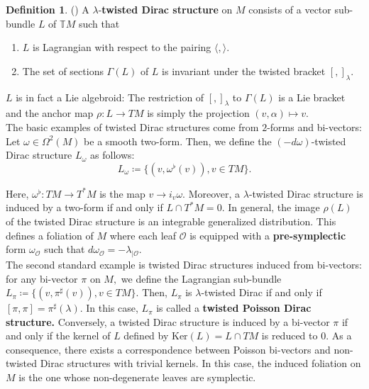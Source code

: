 \documentclass[reqno]{amsart}
\theoremstyle{plain}
\theoremstyle{definition}
\newtheorem{Def}[Thm]{Definition}
\newcommand{\too}{\longrightarrow}
\newcommand{\mtoo}{\longmapsto}
\renewcommand{\O}{\mathcal{O}}
\newcommand{\tM}{\mathbb{T}M}
\begin{document}
\begin{Def}(\cite{bualibanu2026reduction})
  A $\lambda$-\textbf{twisted Dirac structure} on $M$ consists of a vector sub-bundle $L$ of $\tM$ such that \begin{enumerate}
    \item $L$ is Lagrangian with respect to the pairing $\langle, \rangle.$
    \item The set of sections $\Gamma(L)$ of $L$ is invariant under the twisted bracket $[,]_{\lambda}.$
\end{enumerate}
\end{Def}

$L$ is in fact a Lie algebroid: The restriction of $[,]_{\lambda}$ to $\Gamma(L)$ is a Lie bracket and the anchor map $\rho: L \too TM$ is simply the projection $(v,\alpha) \mtoo v.$\\ 

The basic examples of twisted Dirac structures come from $2$-forms and bi-vectors: Let $\omega \in \Omega^{2}(M)$ be a smooth two-form. Then, we define the $(-d\omega)$-twisted Dirac structure $L_{\omega}$ as follows: \[
L_{\omega} \coloneqq \{(v,\omega^{\flat}(v)), v \in TM\}.
\]  

Here, $\omega^{\flat}: TM \too T^{*}M$ is the map $v \too i_{v}\omega.$ Moreover, a $\lambda$-twisted Dirac structure is induced by a two-form if and only if $L \cap T^{*}M = 0.$ In general, the image $\rho(L)$ of the twisted Dirac structure is an integrable generalized distribution. This defines a foliation of $M$ where each leaf $\mathcal{O}$ is equipped with a \textbf{pre-symplectic} form $\omega_{\O}$ such that $d\omega_{\O} = -\lambda_{|\O}.$\\


The second standard example is twisted Dirac structures induced from bi-vectors: for any bi-vector $\pi$ on $M,$ we define the Lagrangian sub-bundle $L_{\pi} \coloneqq  \{(v,\pi^{\sharp}(v)), v\in TM\}.$ Then, $L_{\pi}$ is $\lambda$-twisted Dirac if and only if $[\pi,\pi] = \pi^{\sharp}(\lambda).$ In this case, $L_{\pi}$ is called a \textbf{twisted Poisson Dirac structure.} Conversely, a twisted Dirac structure is induced by a bi-vector $\pi$ if and only if the kernel of $L$ defined by $\text{Ker}(L) = L\cap TM$ is reduced to $0.$ As a consequence, there exists a correspondence between Poisson bi-vectors and non-twisted Dirac structures with trivial kernels. In this case, the induced foliation on $M$ is the one whose non-degenerate leaves are symplectic.\\
\end{document}

